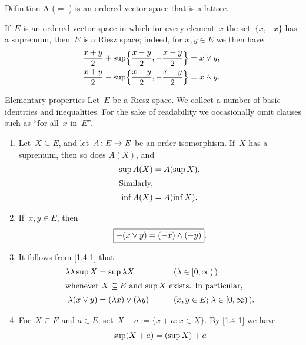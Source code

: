 \documentclass[main.tex]{subfiles}
\begin{document}
%
%
\begin{psec}{Definition}
\label{1.3}
A  ($=$ )
is an ordered vector space that is a lattice.

If~$E$ is an ordered vector space 
in which for every element~$x$
the set~$\{x,-x\}$ has a supremum,
then~$E$ is a Riesz space;
indeed,
for $x,y\in E$
we then have
\begin{align*}
\frac{x+y}{2} + \sup\Bigl\{ \frac{x-y}{2}, -\frac{x-y}{2} \Bigr\} 
  & = x\vee y\text{,} \\ 
\frac{x+y}{2} - \sup\Bigl\{ \frac{x-y}{2}, -\frac{x-y}{2} \Bigr\}
  & = x\wedge y\text{. }
\end{align*}
\end{psec}
%
%
\begin{psec}{Elementary properties}
\label{1.4}
Let~$E$ be a Riesz space. 
We collect a number of basic identities and inequalities.
For the sake of readability
we occasionally omit clauses such as ``for all~$x$ in~$E$''.
\begin{enumerate}
\item %
\label{1.4-1}
Let~$X\subseteq E$, and let~$A\colon E\rightarrow E$ 
be an order isomorphism.
If~$X$ has a supremum,
then so does $A(X)$,
and
\begin{align*}
\sup A(X) &= A(\sup X)
\htam{.} \\
\intertext{%
Similarly, %
}
\inf A(X) &= A(\inf X)
\htam{.}
\end{align*}
\item %
\label{1.4-2}
If~$x,y\in E$, then
\begin{equation*}
\fbox{$  -(x\vee y) = (-x)\wedge(-y)  $}
\text{.}
\end{equation*}
\item %
\label{1.4-3}
It follows from \ref{1.4-1} that
\begin{alignat*}
\lambda \lambda \sup X &= \sup \lambda X \qquad &&(\lambda \in [0,\infty)\,) \\
\intertext{%
whenever~$X\subseteq E$ and~$\sup X$ exists.
In particular, }
\lambda (x \vee y) &=  (\lambda x) \vee (\lambda y) 
  \qquad &&(x,y\in E\htam{; }\lambda\in[0,\infty)\,)\htam{.}
\end{alignat*}
\item %
\label{1.4-4}
For~$X\subseteq E$ and $a\in E$,
set~$X+a:=\{x+a\colon x\in X\}$.
By \ref{1.4-1} we have
\begin{align*}
\sup(X+a) &= (\sup X) + a \\
\intertext{%
}
\end{align*}
\end{enumerate}
\end{psec}
\end{document}
